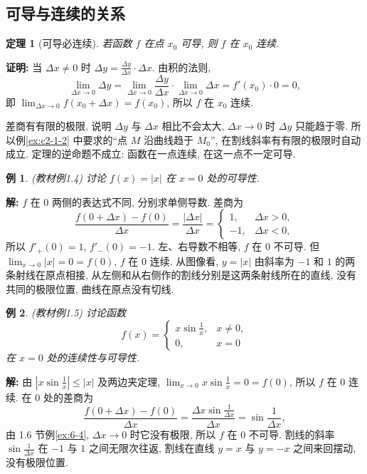 \documentclass[UTF8,openany]{ctexbook}
\theoremstyle{chinesetextbook}
\newtheorem{example}{例}[section]
\newenvironment{cnproof}{\par\indent\textbf{证明:} \ignorespaces}{\par}
\newenvironment{cnsolution}{\par\indent\textbf{解:} \ignorespaces}{\par}
\newtheorem*{theoremsingle}{定理}
\begin{document}
\subsection{可导与连续的关系}
\begin{theoremsingle}[可导必连续]
若函数 $f$ 在点 $x_0$ 可导, 则 $f$ 在 $x_0$ 连续.
\end{theoremsingle}
\begin{cnproof}
当 $\Delta x\ne0$ 时 $\displaystyle\Delta y=\frac{\Delta y}{\Delta x}\cdot\Delta x$. 由积的法则,
\[
\lim_{\Delta x\to0}\Delta y=\lim_{\Delta x\to0}\frac{\Delta y}{\Delta x}\cdot\lim_{\Delta x\to0}\Delta x=f'(x_0)\cdot0=0,
\]
即 $\displaystyle\lim_{\Delta x\to0}f(x_0+\Delta x)=f(x_0)$, 所以 $f$ 在 $x_0$ 连续.
\end{cnproof}
差商有有限的极限, 说明 $\Delta y$ 与 $\Delta x$ 相比不会太大, $\Delta x\to0$ 时 $\Delta y$ 只能趋于零. 所以例\ref{ex:c2-1-2} 中要求的“点 $M$ 沿曲线趋于 $M_0$”, 在割线斜率有有限的极限时自动成立. 定理的逆命题不成立: 函数在一点连续, 在这一点不一定可导.
\begin{example}\label{ex:c2-1-4}
\textnormal{(教材例1.4)} 讨论 $f(x)=|x|$ 在 $x=0$ 处的可导性.
\end{example}
\begin{cnsolution}
$f$ 在 $0$ 两侧的表达式不同, 分别求单侧导数. 差商为
\[
\frac{f(0+\Delta x)-f(0)}{\Delta x}=\frac{|\Delta x|}{\Delta x}=\begin{cases}1,&\Delta x>0,\\-1,&\Delta x<0,\end{cases}
\]
所以 $f'_+(0)=1$, $f'_-(0)=-1$. 左、右导数不相等, $f$ 在 $0$ 不可导. 但 $\displaystyle\lim_{x\to0}|x|=0=f(0)$, $f$ 在 $0$ 连续. 从图像看, $y=|x|$ 由斜率为 $-1$ 和 $1$ 的两条射线在原点相接, 从左侧和从右侧作的割线分别是这两条射线所在的直线, 没有共同的极限位置, 曲线在原点没有切线.
\end{cnsolution}
\begin{example}\label{ex:c2-1-5}
\textnormal{(教材例1.5)} 讨论函数
\[
f(x)=\begin{cases}x\sin\frac1x,&x\ne0,\\0,&x=0\end{cases}
\]
在 $x=0$ 处的连续性与可导性.
\end{example}
\begin{cnsolution}
由 $\displaystyle\left|x\sin\frac1x\right|\le|x|$ 及两边夹定理, $\displaystyle\lim_{x\to0}x\sin\frac1x=0=f(0)$, 所以 $f$ 在 $0$ 连续. 在 $0$ 处的差商为
\[
\frac{f(0+\Delta x)-f(0)}{\Delta x}=\frac{\Delta x\sin\frac1{\Delta x}}{\Delta x}=\sin\frac1{\Delta x},
\]
由 1.6 节例\ref{ex:6-4}, $\Delta x\to0$ 时它没有极限, 所以 $f$ 在 $0$ 不可导. 割线的斜率 $\displaystyle\sin\frac1{\Delta x}$ 在 $-1$ 与 $1$ 之间无限次往返, 割线在直线 $y=x$ 与 $y=-x$ 之间来回摆动, 没有极限位置.
\end{cnsolution}
\end{document}

